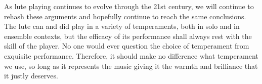 As lute playing continues to evolve through the 21st century, we will continue to
rehash these arguments and hopefully continue to reach the same conclusions. The lute
can and did play in a variety of temperaments, both in solo and in ensemble contexts,
but the efficacy of its performance shall always rest with the skill of the player. No
one would ever question the choice of temperament from exquisite performance.
Therefore, it should make no difference what temperament we use, so long as it
represents the music giving it the warmth and brilliance that it justly deserves.
